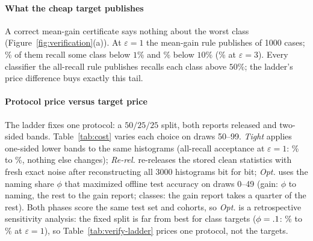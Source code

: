 \paragraph{What the cheap target publishes}
A correct mean-gain certificate says nothing about the worst class
(Figure~\ref{fig:verification}(a)). At $\varepsilon=1$ the mean-gain rule
publishes \MinRecGainOnePub{} of 1000 cases; \MinRecGainOneZero{}\% of them
recall some class below $1\%$ and \MinRecGainOneTenth{}\% below $10\%$
(\MinRecGainThreeTenth{}\% at $\varepsilon=3$). Every classifier the
all-recall rule publishes recalls each class above $50\%$; the ladder's price
difference buys exactly this tail.



\paragraph{Protocol price versus target price}
The ladder fixes one protocol: a $50/25/25$ split, both reports released and
two-sided bands. Table~\ref{tab:cost} varies each choice on draws 50--99.
\emph{Tight} applies one-sided lower bands to the same histograms (all-recall
acceptance at $\varepsilon=1$: \CostFixedRecallOne{}\% to
\CostTightRecallOne{}\%, nothing else changes); \emph{Re-rel.} re-releases
the stored clean statistics with fresh exact noise after reconstructing all
3000 histograms bit for bit; \emph{Opt.} uses the naming share $\phi$ that
maximized offline test accuracy on draws 0--49 (gain: $\phi$ to naming, the
rest to the gain report; classes: the gain report takes a quarter of the
rest). Both phases score the same test set and cohorts, so \emph{Opt.} is a
retrospective sensitivity analysis: the fixed split is far from best for class
targets ($\phi=.1$: \CostRefRecallOne{}\% to
\CostOptRecallOne{}\% at $\varepsilon=1$), so Table~\ref{tab:verify-ladder}
prices one protocol, not the targets.



